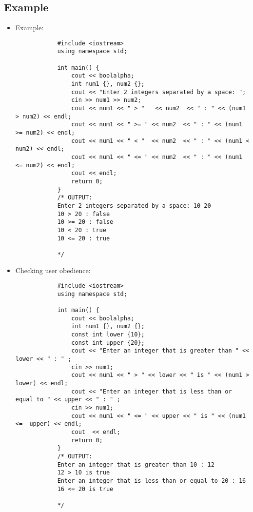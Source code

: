 \subsection{Example}
\begin{itemize}
    \item Example: 
        \begin{verbatim}
            #include <iostream>
            using namespace std;

            int main() {
                cout << boolalpha;
                int num1 {}, num2 {};
                cout << "Enter 2 integers separated by a space: ";
                cin >> num1 >> num2;
                cout << num1 << " > "   << num2  << " : " << (num1 > num2) << endl;
                cout << num1 << " >= " << num2  << " : " << (num1 >= num2) << endl;
                cout << num1 << " < "  << num2  << " : " << (num1 < num2) << endl;
                cout << num1 << " <= " << num2  << " : " << (num1 <= num2) << endl;
                cout << endl;
                return 0;
            }
            /* OUTPUT:
            Enter 2 integers separated by a space: 10 20
            10 > 20 : false
            10 >= 20 : false
            10 < 20 : true
            10 <= 20 : true

            */
        \end{verbatim}
    
    \item Checking user obedience: 
        \begin{verbatim}
            #include <iostream>
            using namespace std;

            int main() {
                cout << boolalpha;
                int num1 {}, num2 {};
                const int lower {10};
                const int upper {20};
                cout << "Enter an integer that is greater than " << lower << " : " ;
                cin >> num1;
                cout << num1 << " > " << lower << " is " << (num1 > lower) << endl;
                cout << "Enter an integer that is less than or equal to " << upper << " : " ;
                cin >> num1;
                cout << num1 << " <= " << upper << " is " << (num1 <=  upper) << endl;
                cout  << endl;
                return 0;
            }
            /* OUTPUT:
            Enter an integer that is greater than 10 : 12
            12 > 10 is true
            Enter an integer that is less than or equal to 20 : 16
            16 <= 20 is true

            */
        \end{verbatim}
\end{itemize}


